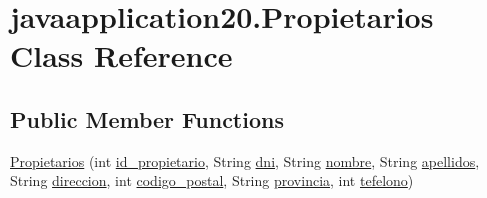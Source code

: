 \hypertarget{classjavaapplication20_1_1_propietarios}{}\section{javaapplication20.\+Propietarios Class Reference}
\label{classjavaapplication20_1_1_propietarios}
\subsection*{Public Member Functions}
\begin{DoxyCompactItemize}
\item 
\mbox{\hyperlink{classjavaapplication20_1_1_propietarios_ae21fb6967fd3c71061c60b91e5bfdb7b}{Propietarios}} (int \mbox{\hyperlink{classjavaapplication20_1_1_propietarios_a0d9654913e9342d45346e4b8086c99fd}{id\+\_\+propietario}}, String \mbox{\hyperlink{classjavaapplication20_1_1_propietarios_ab18a08d3653627babc033432dbb281e8}{dni}}, String \mbox{\hyperlink{classjavaapplication20_1_1_propietarios_a829d4d9b2f229a3b406b426fe3af9f18}{nombre}}, String \mbox{\hyperlink{classjavaapplication20_1_1_propietarios_a9b897b9be023e6bfe54f693f6abd4990}{apellidos}}, String \mbox{\hyperlink{classjavaapplication20_1_1_propietarios_a65fcf66e9d2944122d66c3ea3593feb5}{direccion}}, int \mbox{\hyperlink{classjavaapplication20_1_1_propietarios_a3b56a934dce029ef1cb5d5f61d189538}{codigo\+\_\+postal}}, String \mbox{\hyperlink{classjavaapplication20_1_1_propietarios_a4d34e2698807c08fa013a2a24fb0aecf}{provincia}}, int \mbox{\hyperlink{classjavaapplication20_1_1_propietarios_aed6eadeca2eaedfde708ff2b39606bf9}{tefelono}})
\end{DoxyCompactItemize}
